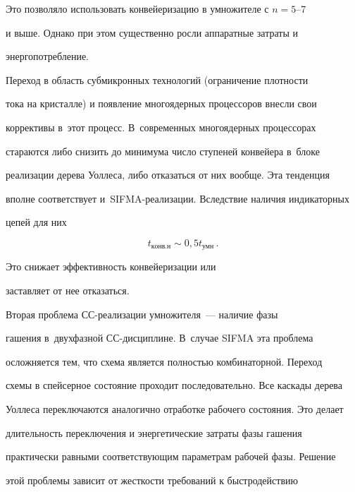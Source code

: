      \noindent

     Это позволяло использовать конвейеризацию в умножителе с $n = 5$--7

и выше. Однако при этом существенно росли аппаратные затраты и

энер\-го\-по\-треб\-ление.



     Переход в область субмикронных технологий (ограничение плотности

тока на кристалле) и появление многоядерных процессоров внесли свои

коррективы в~этот процесс. В~современных многоядерных процессорах

стараются либо снизить до минимума число ступеней конвейера в~блоке

реализации дерева Уоллеса, либо отказаться от них вообще. Эта тенденция

вполне соответствует и~SIFMA-ре\-а\-ли\-за\-ции. Вследствие наличия индикаторных

цепей для них

     \begin{equation}

     t_{\mathrm{конв.н}}\sim 0{,}5 t_{\mathrm{умн}}\,.

        \label{e3-st1}

     \end{equation}





     \noindent

     Это снижает эффективность конвейеризации или

заставляет от нее отказаться.



      Вторая проблема СС-реализации умножителя~---  наличие фазы

гашения в~двухфазной СС-дис\-цип\-ли\-не. В~случае SIFMA эта проблема

осложняется тем, что схема является полностью комбинаторной. Переход

схемы в спейсерное состояние проходит последовательно. Все каскады дерева

Уоллеса переключаются аналогично отработке рабочего состояния. Это делает

длительность переключения и энергетические затраты фазы гашения

практически равными соответствующим параметрам рабочей фазы. Решение

этой проблемы зависит от жесткости требований к быстродействию

